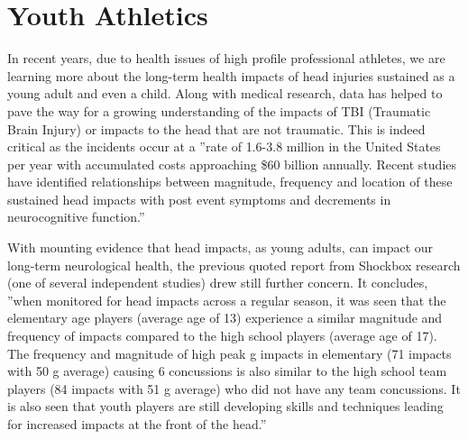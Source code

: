 \documentclass[sigconf]{acmart}
\begin{document}
\section{Youth Athletics}

In recent years, due to health issues of high profile professional athletes, we are learning more about the long-term health impacts of head injuries sustained as a young adult and even a child.  Along with medical research, data has helped to pave the way for a growing understanding of the impacts of TBI (Traumatic Brain Injury) or impacts to the head that are not traumatic.  This is indeed critical as the incidents occur at a ''rate of 1.6-3.8 million in the United States per year with accumulated costs approaching \$60 billion annually.  Recent studies have identified relationships between magnitude, frequency and location of these sustained head impacts with post event symptoms and decrements in neurocognitive function.''\cite{www-theshockbox-com}

With mounting evidence that head impacts, as young adults, can impact our long-term neurological health, the previous quoted report from Shockbox research (one of several independent studies) drew still further concern.  It concludes, ''when monitored for head impacts across a regular season, it was seen that the elementary age players (average age of 13) experience a similar magnitude and frequency of impacts compared to the high school players (average age of 17).  The frequency and magnitude of high peak g impacts in elementary (71 impacts with 50 g average) causing 6 concussions is also similar to the high school team players (84 impacts with 51 g average) who did not have any team concussions.  It is also seen that youth players are still developing skills and techniques leading for increased impacts at the front of the head.'' \cite{www-theshockbox-com} 
\end{document}
